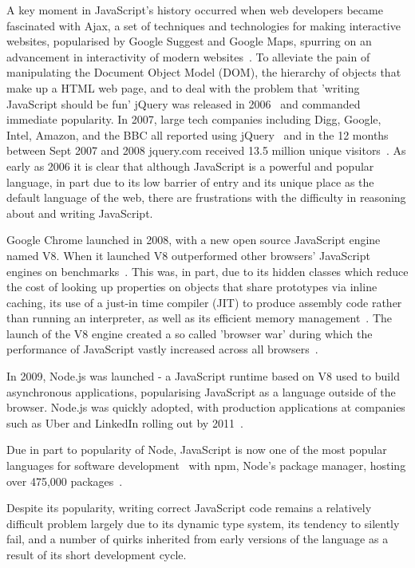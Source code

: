 \documentclass[]{final_report}
\begin{document}
A key moment in JavaScript's history occurred when web developers became fascinated with Ajax, a set of techniques and technologies for making interactive websites, popularised by Google Suggest and Google Maps, spurring on an advancement in interactivity of modern websites~\cite{ajax}. To alleviate the pain of manipulating the Document Object Model (DOM), the hierarchy of objects that make up a HTML web page, and to deal with the problem that 'writing JavaScript should be fun' jQuery was released in 2006~\cite{historyofjquery} and commanded immediate popularity. In 2007, large tech companies including Digg, Google, Intel, Amazon, and the BBC all reported using jQuery~\cite{historyofjquery} and in the 12 months between Sept 2007 and 2008 jquery.com received 13.5 million unique visitors~\cite{stateofjquery}. As early as 2006 it is clear that although JavaScript is a powerful and popular language, in part due to its low barrier of entry and its unique place as the default language of the web, there are frustrations with the difficulty in reasoning about and writing JavaScript.

Google Chrome launched in 2008, with a new open source JavaScript engine named V8. When it launched V8 outperformed other browsers' JavaScript engines on benchmarks~\cite{chromebenchmarks}. This was, in part, due to its hidden classes which reduce the cost of looking up properties on objects that share prototypes via inline caching, its use of a just-in time compiler (JIT) to produce assembly code rather than running an interpreter, as well as its efficient memory management~\cite{chromeengine, chromeengine2}. The launch of the V8 engine created a so called 'browser war' during which the performance of JavaScript vastly increased across all browsers~\cite{knowyourenginesmozilla}.

In 2009, Node.js was launched - a JavaScript runtime based on V8 used to build asynchronous applications, popularising JavaScript as a language outside of the browser. Node.js was quickly adopted, with production applications at companies such as Uber and LinkedIn rolling out by 2011~\cite{linkedinusesnode, uberusesnode}. 

Due in part to popularity of Node, JavaScript is now one of the most popular languages for software development~\cite{stackoverflowsurvey, tiobeindex2017nov} with npm, Node's package manager, hosting over 475,000 packages~\cite{npm}.

Despite its popularity, writing correct JavaScript code remains a relatively difficult problem largely due to its dynamic type system, its tendency to silently fail, and a number of quirks inherited from early versions of the language as a result of its short development cycle.
\end{document}
